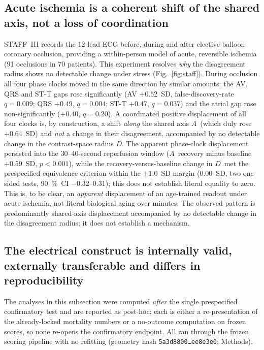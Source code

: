 \documentclass[11pt]{article}
\newcommand{\D}{\ensuremath{D}}
\newcommand{\A}{\ensuremath{A}}
\begin{document}
\subsection{Acute ischemia is a coherent shift of the shared axis, not a loss of coordination}
\label{sec:staff}

STAFF~III records the 12-lead ECG before, during and after elective balloon coronary
occlusion, providing a within-person model of acute, reversible ischemia (\num{91}
occlusions in \num{70} patients). This experiment resolves \emph{why} the disagreement
radius shows no detectable change under stress (Fig.~\ref{fig:staff}). During occlusion all four phase
clocks moved in the same direction by similar amounts: the AV, QRS and ST-T gaps rose
significantly (AV $+\num{0.52}$~SD, false-discovery-rate $q=\num{0.009}$; QRS
$+\num{0.49}$, $q=\num{0.004}$; ST-T $+\num{0.47}$, $q=\num{0.037}$) and the atrial
gap rose non-significantly ($+\num{0.40}$, $q=\num{0.20}$). A coordinated positive
displacement of all four clocks is, by construction, a shift \emph{along} the shared
axis \A\ (which duly rose $+\num{0.64}$~SD) and \emph{not} a change in their
disagreement, accompanied by no detectable change in the contrast-space radius
\D. The apparent phase-clock
displacement persisted into the \numrange{30}{40}-second reperfusion window (\A\
recovery minus baseline $+\num{0.59}$~SD, $p<\num{0.001}$), while the recovery-versus-baseline
change in \D\ met the prespecified equivalence criterion within the
$\pm\num{1.0}$~SD margin (\num{0.00}~SD, two one-sided tests,
\SI{90}{\percent}~CI \numrange{-0.32}{0.31}); this does not establish literal
equality to zero. This is, to be clear, an \emph{apparent}
displacement of an age-trained readout under acute ischemia, not literal biological
aging over minutes. The observed pattern is predominantly shared-axis
displacement accompanied by no detectable change in the disagreement radius;
it does not establish a mechanism.

\subsection{The electrical construct is internally valid, externally transferable and differs in reproducibility}
\label{sec:robust}
The analyses in this subsection were computed \emph{after} the single prespecified
confirmatory test and are reported as post-hoc; each is either a re-presentation of the
already-locked mortality numbers or a no-outcome computation on frozen scores, so none
re-opens the confirmatory endpoint. All ran through the frozen scoring pipeline with no
refitting (geometry hash \texttt{5a3d8800\dots ee8e3e0}; Methods).
\end{document}
